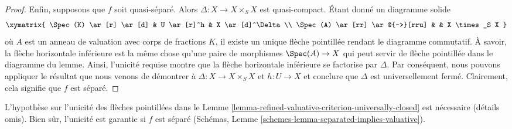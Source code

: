 \begin{proof}
\medskip\noindent
Enfin, supposons que $f$ soit quasi-séparé. Alors $\Delta : X \to X \times_S X$ est quasi-compact.
Étant donné un diagramme solide
$$
\xymatrix{
\Spec(K) \ar[r] \ar[d] & U \ar[r]^h & X \ar[d]^\Delta \\
\Spec(A) \ar[rr] \ar@{-->}[rru] & & X \times_S X
}
$$
où $A$ est un anneau de valuation avec corps de fractions $K$,
il existe un unique flèche pointillée rendant le diagramme commutatif.
À savoir, la flèche horizontale inférieure est la même chose qu'une paire
de morphismes $\Spec(A) \to X$ qui peut servir de flèche pointillée dans le diagramme
du lemme. Ainsi, l'unicité requise montre que la flèche horizontale
inférieure se factorise par $\Delta$. Par conséquent,
nous pouvons appliquer le résultat que nous
venons de démontrer à $\Delta : X \to X \times_S X$ et $h : U \to X$ et conclure que $\Delta$
est universellement fermé. Clairement, cela signifie que $f$
est séparé.
\end{proof}

\begin{remark}
\label{remark-check-val-on-open}
L'hypothèse sur l'unicité des flèches
pointillées dans le Lemme \ref{lemma-refined-valuative-criterion-universally-closed} est nécessaire
(détails omis). Bien sûr, l'unicité est garantie
si $f$
est séparé (Schémas, Lemme \ref{schemes-lemma-separated-implies-valuative}).
\end{remark}

